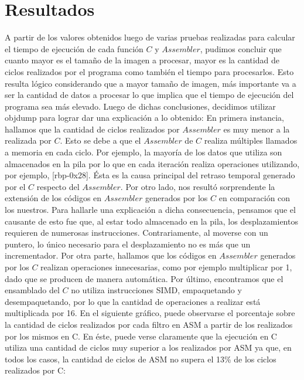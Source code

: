 \documentclass[10pt, a4paper]{article}
\begin{document}
\section{Resultados}
A partir de los valores obtenidos luego de varias pruebas realizadas para calcular el tiempo de ejecución de cada función $C$ y $Assembler$, pudimos concluir que cuanto mayor es el tamaño de la imagen a procesar, mayor es la cantidad de ciclos realizados por el programa como también el tiempo para procesarlos. Esto resulta lógico considerando que a mayor tamaño de imagen, más importante va a ser la cantidad de datos a procesar lo que implica que el tiempo de ejecución del programa sea más elevado.\newline
Luego de dichas conclusiones, decidimos utilizar objdump para lograr dar una explicación a lo obtenido:\newline
En primera instancia, hallamos que la cantidad de ciclos realizados por $Assembler$ es muy menor a la realizada por $C$. Esto se debe a que el $Assembler$ de $C$ realiza múltiples llamados a memoria en cada ciclo. Por ejemplo, la mayoría de los datos que utiliza son almacenados en la pila por lo que en cada iteración realiza operaciones utilizando, por ejemplo, [rbp-0x28]. Ésta es la causa principal del retraso temporal generado por el $C$ respecto del $Assembler$. \newline 
Por otro lado, nos resultó sorprendente la extensión de los códigos en $Assembler$ generados por los $C$ en comparación con los nuestros. Para hallarle una explicación a dicha consecuencia, pensamos que el causante de esto fue que, al estar todo almacenado en la pila, los desplazamientos requieren de numerosas instrucciones. Contrariamente, al moverse con un puntero, lo único necesario para el desplazamiento no es más que un incrementador. \newline
Por otra parte, hallamos que los códigos en $Assembler$ generados por los $C$ realizan operaciones innecesarias, como por ejemplo multiplicar por 1, dado que se producen de manera automática.\newline
Por último, encontramos que el ensamblado del $C$ no utiliza instrucciones SIMD, empaquetando y desempaquetando, por lo que la cantidad de operaciones a realizar está multiplicada por 16.\newline
En el siguiente gráfico, puede observarse el porcentaje sobre la cantidad de ciclos realizados por cada filtro en ASM a partir de los realizados por los mismos en C. En éste, puede verse claramente que la ejecución en C utiliza una cantidad de ciclos muy superior a los realizados por ASM ya que, en todos los casos, la cantidad de ciclos de ASM no supera el 13\% de los ciclos realizados por C:\newline
\end{document}

